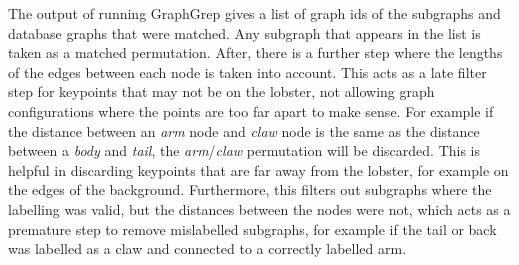 The output of running GraphGrep gives a list of graph ids of the subgraphs and database graphs that were matched. Any subgraph that appears in the list is taken as a matched permutation. After, there is a further step where the lengths of the edges between each node is taken into account. This acts as a late filter step for keypoints that may not be on the lobster, not allowing graph configurations where the points are too far apart to make sense. For example if the distance between an \textit{arm} node and \textit{claw} node is the same as the distance between a \textit{body} and \textit{tail}, the \textit{arm}/\textit{claw} permutation will be discarded. This is helpful in discarding keypoints that are far away from the lobster, for example on the edges of the background. Furthermore, this filters out subgraphs where the labelling was valid, but the distances between the nodes were not, which acts as a premature step to remove mislabelled subgraphs, for example if the tail or back was labelled as a claw and connected to a correctly labelled arm. 

